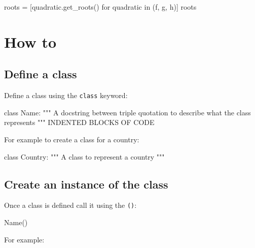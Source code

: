 \begin{pyin}
roots = [quadratic.get_roots() for quadratic in (f, g, h)]
roots
\end{pyin}





\begin{raw}
[((-1.4, 0), (1.0, 0)),
 ((1.3971808598447282, 0), (-2.1471808598447284, 0)),
 ((-0.5, 2.179449471770337), (-0.5, -2.179449471770337))]
\end{raw}








\section{How to}

\subsection{Define a class}

Define a class using the \texttt{class} keyword:


\begin{api}
class Name:
    """
    A docstring between triple quotation to describe what the class represents
    """
    INDENTED BLOCKS OF CODE
\end{api}



For example to create a class for a country:




\begin{pyin}
class Country:
    """
    A class to represent a country
    """
\end{pyin}





\subsection{Create an instance of the class}

Once a class is defined call it using the \texttt{()}:


\begin{api}
Name()
\end{api}



For example:





